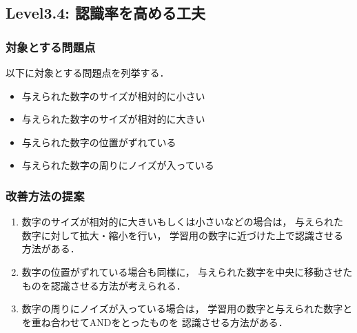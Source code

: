 \subsection{Level3.4: 認識率を高める工夫}
\subsubsection{対象とする問題点}
以下に対象とする問題点を列挙する．
\begin{itemize}
\item 与えられた数字のサイズが相対的に小さい
\item 与えられた数字のサイズが相対的に大きい
\item 与えられた数字の位置がずれている
\item 与えられた数字の周りにノイズが入っている
\end{itemize}

\subsubsection{改善方法の提案}
\begin{enumerate}
\item 数字のサイズが相対的に大きいもしくは小さいなどの場合は，
与えられた数字に対して拡大・縮小を行い，%
学習用の数字に近づけた上で認識させる方法がある．
\item 数字の位置がずれている場合も同様に，
与えられた数字を中央に移動させたものを認識させる方法が考えられる．
\item 数字の周りにノイズが入っている場合は，
学習用の数字と与えられた数字とを重ね合わせてANDをとったものを
認識させる方法がある．
\end{enumerate}

